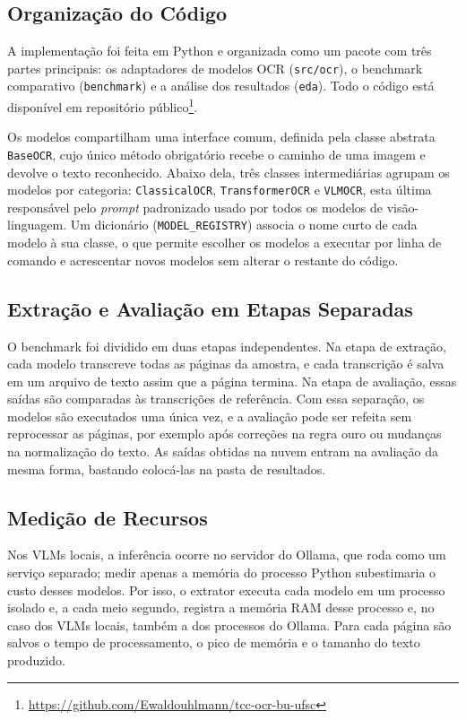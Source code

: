\documentclass[noabntexcite,oneside]{ufsc-thesis-rn46-2019}
\begin{document}
\subsection{Organização do Código}

A implementação foi feita em Python e organizada como um pacote com três partes principais:
os adaptadores de modelos OCR (\texttt{src/ocr}), o benchmark comparativo
(\texttt{benchmark}) e a análise dos resultados (\texttt{eda}). Todo o código está
disponível em repositório público\footnote{\url{https://github.com/Ewaldouhlmann/tcc-ocr-bu-ufsc}}.

Os modelos compartilham uma interface comum, definida pela classe abstrata
\texttt{BaseOCR}, cujo único método obrigatório recebe o caminho de uma imagem e devolve o
texto reconhecido. Abaixo dela, três classes intermediárias agrupam os modelos por
categoria: \texttt{ClassicalOCR}, \texttt{TransformerOCR} e \texttt{VLMOCR}, esta última
responsável pelo \textit{prompt} padronizado usado por todos os modelos de
visão-linguagem. Um dicionário (\texttt{MODEL\_REGISTRY}) associa o nome curto de cada
modelo à sua classe, o que permite escolher os modelos a executar por linha de comando e
acrescentar novos modelos sem alterar o restante do código.

\subsection{Extração e Avaliação em Etapas Separadas}

O benchmark foi dividido em duas etapas independentes. Na etapa de extração, cada modelo
transcreve todas as páginas da amostra, e cada transcrição é salva em um arquivo de texto
assim que a página termina. Na etapa de avaliação, essas saídas são comparadas às
transcrições de referência. Com essa separação, os modelos são executados uma única vez, e
a avaliação pode ser refeita sem reprocessar as páginas, por exemplo após correções na
regra ouro ou mudanças na normalização do texto. As saídas obtidas na nuvem entram na avaliação da mesma forma, bastando colocá-las na pasta de resultados.

\subsection{Medição de Recursos}

Nos VLMs locais, a inferência ocorre no servidor do Ollama, que roda como um serviço
separado; medir apenas a memória do processo Python subestimaria o custo desses modelos.
Por isso, o extrator executa cada modelo em um processo isolado e, a cada meio segundo,
registra a memória RAM desse processo e, no caso dos VLMs locais, também a dos processos do
Ollama. Para cada página são salvos o tempo de processamento, o pico de memória e o tamanho
do texto produzido.
\end{document}

